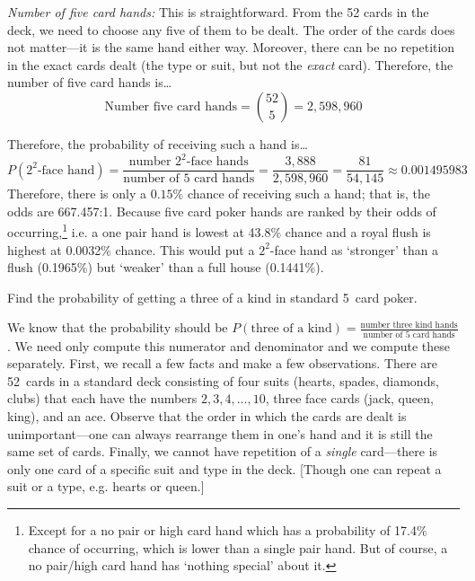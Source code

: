 \documentclass[11pt,letterpaper]{article}
\begin{document}
{\itshape Number of five card hands:} This is straightforward. From the 52 cards in the deck, we need to choose any five of them to be dealt. The order of the cards does not matter---it is the same hand either way. Moreover, there can be no repetition in the exact cards dealt (the type or suit, but not the \textit{exact} card). Therefore, the number of five card hands is\dots
	\[
	\text{Number five card hands}= \binom{52}{5}= 2,\!598,\!960
	\] \pspace

Therefore, the probability of receiving such a hand is\dots
	\[
	P(2^2 \text{-face hand})= \dfrac{\text{number } 2^2 \text{-face hands}}{\text{number of 5 card hands}}= \dfrac{3,\!888}{2,\!598,\!960}= \dfrac{81}{54,\!145} \approx 0.001495983
	\]
Therefore, there is only a $0.15\%$ chance of receiving such a hand; that is, the odds are 667.457:1. Because five card poker hands are ranked by their odds of occurring,\footnote{Except for a no pair or high card hand which has a probability of 17.4\% chance of occurring, which is lower than a single pair hand. But of course, a no pair/high card hand has `nothing special' about it.} i.e. a one pair hand is lowest at 43.8\% chance and a royal flush is highest at 0.0032\% chance. This would put a $2^2$-face hand as `stronger' than a flush (0.1965\%) but `weaker' than a full house (0.1441\%). 



\newpage



 Find the probability of getting a three of a kind in standard 5~card poker. \pspace

\sol We know that the probability should be $P(\text{three of a kind})= \tfrac{\text{number three kind hands}}{\text{number of 5 card hands}}$. We need only compute this numerator and denominator and we compute these separately. First, we recall a few facts and make a few observations. There are 52~cards in a standard deck consisting of four suits (hearts, spades, diamonds, clubs) that each have the numbers $2, 3, 4, \ldots, 10$, three face cards (jack, queen, king), and an ace. Observe that the order in which the cards are dealt is unimportant---one can always rearrange them in one's hand and it is still the same set of cards. Finally, we cannot have repetition of a \textit{single} card---there is only one card of a specific suit and type in the deck. [Though one can repeat a suit or a type, e.g. hearts or queen.] \pspace 
\end{document}
